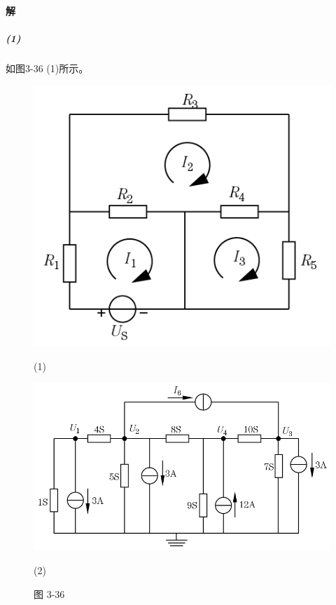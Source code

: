 \documentclass[hyperref, UTF8]{ctexart}
\begin{document}
\paragraph{解}
\subparagraph{(1)}如图3-36 (1)所示。

\begin{figure}[!htb]
\centering
\begin{minipage}[t]{0.309\textwidth}
\centering
\includegraphics[width=1\textwidth]{p3-36-1-sol.png}
\caption*{(1)}
\end{minipage}
\begin{minipage}[t]{0.505\textwidth}
\centering
\includegraphics[width=1\textwidth]{p3-36-2-sol.png}
\caption*{(2)}
\end{minipage}
\caption*{图 3-36}
\end{figure}
\end{document}

